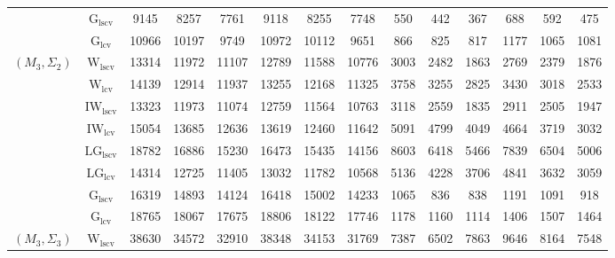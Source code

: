 \begin{table}[!ht]
{\begin{tabular}{@{}cc|ccc|ccc|ccc|ccc@{}}
 & $\mathrm{G}_{\mathrm{lscv}}$ & 9145 & 8257 & 7761 & 9118 & 8255 & 7748 & \cellcolor{black!30}550 & \cellcolor{black!30}442 & \cellcolor{black!30}367 & \cellcolor{black!30}688 & \cellcolor{black!30}592 & \cellcolor{black!30}475 \\ 
 & $\mathrm{G}_{\mathrm{lcv}}$ & 10966 & 10197 & 9749 & 10972 & 10112 & 9651 & \cellcolor{black!10}866 & \cellcolor{black!10}825 & \cellcolor{black!10}817 & \cellcolor{black!10}1177 & \cellcolor{black!10}1065 & \cellcolor{black!10}1081 \\ 
\midrule
$(M_3,\Sigma_2)$ & $\mathrm{W}_{\mathrm{lscv}}$ & \cellcolor{black!30}13314 & \cellcolor{black!30}11972 & \cellcolor{black!10}11107 & \cellcolor{black!10}12789 & \cellcolor{black!10}11588 & 10776 & 3003 & 2482 & 1863 & 2769 & 2379 & 1876 \\ 
 & $\mathrm{W}_{\mathrm{lcv}}$ & 14139 & 12914 & 11937 & 13255 & 12168 & 11325 & 3758 & 3255 & 2825 & 3430 & 3018 & 2533 \\ 
 & $\mathrm{IW}_{\mathrm{lscv}}$ & \cellcolor{black!10}13323 & \cellcolor{black!10}11973 & \cellcolor{black!30}11074 & \cellcolor{black!30}12759 & \cellcolor{black!30}11564 & \cellcolor{black!10}10763 & 3118 & 2559 & 1835 & 2911 & 2505 & 1947 \\ 
 & $\mathrm{IW}_{\mathrm{lcv}}$ & 15054 & 13685 & 12636 & 13619 & 12460 & 11642 & 5091 & 4799 & 4049 & 4664 & 3719 & 3032 \\ 
 & $\mathrm{LG}_{\mathrm{lscv}}$ & 18782 & 16886 & 15230 & 16473 & 15435 & 14156 & 8603 & 6418 & 5466 & 7839 & 6504 & 5006 \\ 
 & $\mathrm{LG}_{\mathrm{lcv}}$ & 14314 & 12725 & 11405 & 13032 & 11782 & \cellcolor{black!30}10568 & 5136 & 4228 & 3706 & 4841 & 3632 & 3059 \\ 
 & $\mathrm{G}_{\mathrm{lscv}}$ & 16319 & 14893 & 14124 & 16418 & 15002 & 14233 & \cellcolor{black!30}1065 & \cellcolor{black!30}836 & \cellcolor{black!30}838 & \cellcolor{black!30}1191 & \cellcolor{black!30}1091 & \cellcolor{black!30}918 \\ 
 & $\mathrm{G}_{\mathrm{lcv}}$ & 18765 & 18067 & 17675 & 18806 & 18122 & 17746 & \cellcolor{black!10}1178 & \cellcolor{black!10}1160 & \cellcolor{black!10}1114 & \cellcolor{black!10}1406 & \cellcolor{black!10}1507 & \cellcolor{black!10}1464 \\ 
\midrule
$(M_3,\Sigma_3)$ & $\mathrm{W}_{\mathrm{lscv}}$ & 38630 & 34572 & 32910 & 38348 & 34153 & 31769 & \cellcolor{black!10}7387 & \cellcolor{black!10}6502 & 7863 & \cellcolor{black!10}9646 & \cellcolor{black!10}8164 & \cellcolor{black!10}7548 \\ 

\end{tabular}}
\end{table}
